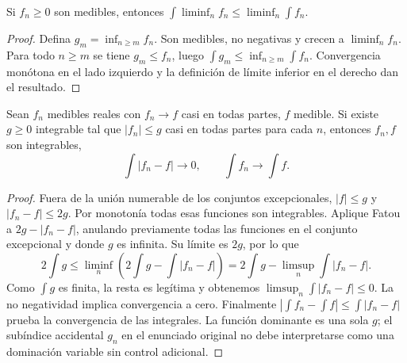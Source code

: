 \begin{teorema}[Fatou]\label{teo:v2-fatou}
Si $f_n\ge0$ son medibles, entonces $\int\liminf_nf_n\le\liminf_n\int f_n$.
\end{teorema}
\begin{proof}
Defina $g_m=\inf_{n\ge m}f_n$. Son medibles, no negativas y crecen a $\liminf_nf_n$. Para todo $n\ge m$ se tiene $g_m\le f_n$, luego $\int g_m\le\inf_{n\ge m}\int f_n$. Convergencia monótona en el lado izquierdo y la definición de límite inferior en el derecho dan el resultado.
\end{proof}
\begin{teorema}\label{teo:v2-dct}
Sean $f_n$ medibles reales con $f_n\to f$ casi en todas partes, $f$ medible. Si existe $g\ge0$ integrable tal que $|f_n|\le g$ casi en todas partes para cada $n$, entonces $f_n,f$ son integrables,
\[\int|f_n-f|\longrightarrow0,\qquad\int f_n\longrightarrow\int f.\]
\end{teorema}
\begin{proof}
Fuera de la unión numerable de los conjuntos excepcionales, $|f|\le g$ y $|f_n-f|\le2g$. Por monotonía todas esas funciones son integrables. Aplique Fatou a $2g-|f_n-f|$, anulando previamente todas las funciones en el conjunto excepcional y donde $g$ es infinita. Su límite es $2g$, por lo que
\[2\int g\le\liminf_n\left(2\int g-\int|f_n-f|\right)
=2\int g-\limsup_n\int|f_n-f|.\]
Como $\int g$ es finita, la resta es legítima y obtenemos $\limsup_n\int|f_n-f|\le0$. La no negatividad implica convergencia a cero. Finalmente $|\int f_n-\int f|\le\int|f_n-f|$ prueba la convergencia de las integrales. La función dominante es una sola $g$; el subíndice accidental $g_n$ en el enunciado original no debe interpretarse como una dominación variable sin control adicional.
\end{proof}

